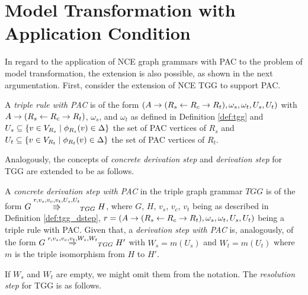 \section{Model Transformation with Application Condition}
In regard to the application of NCE graph grammars with PAC to the problem of model transformation, the extension is also possible, as shown in the next argumentation. First, consider the extension of NCE TGG to support PAC. 

\begin{definition}
	A \emph{triple rule with PAC} is of the form $(A \to (R_s \overset{}{\leftarrow} R_c \overset{}{\rightarrow} R_t), \omega_s, \omega_t, U_s, U_t)$ with $A \to (R_s \overset{}{\leftarrow} R_c \overset{}{\rightarrow} R_t)$, $\omega_s$, and $\omega_t$ as defined in Definition \ref{def:tgg} and $U_s \subseteq \{v \in V_{R_s} \; | \; \phi_{R_s}(v) \in \Delta\}$ the set of PAC vertices of $R_s$ and $U_t \subseteq \{v \in V_{R_t} \; | \; \phi_{R_t}(v) \in \Delta\}$ the set of PAC vertices of $R_t$.
\end{definition}

Analogously, the concepts of \textit{concrete derivation step} and \textit{derivation step} for TGG are extended to be as follows.

\begin{definition}
 A \textit{concrete derivation step with PAC} in the triple graph grammar $TGG$ is of the form $G \overset{r,v_s,v_c,v_t,U_s,U_t}{\Rrightarrow}_{TGG} H$, where $G$, $H$, $v_s$, $v_c$, $v_t$ being as described in Definition \ref{def:tgg_dstep}, $r = (A \to (R_s \overset{}{\leftarrow} R_c \overset{}{\rightarrow} R_t), \omega_s, \omega_t, U_s, U_t)$ being a triple rule with PAC. Given that, a \textit{derivation step with PAC} is, analogously, of the form $G \tderivpac{r}{v_s,v_c,v_t}{W_s,W_t}{TGG} H'$ with $W_s = m(U_s)$ and $W_t = m(U_t)$ where $m$ is the triple isomorphism from $H$ to $H'$.
\end{definition}

If $W_s$ and $W_t$ are empty, we might omit them from the notation. The \textit{resolution step} for TGG is as follows.

